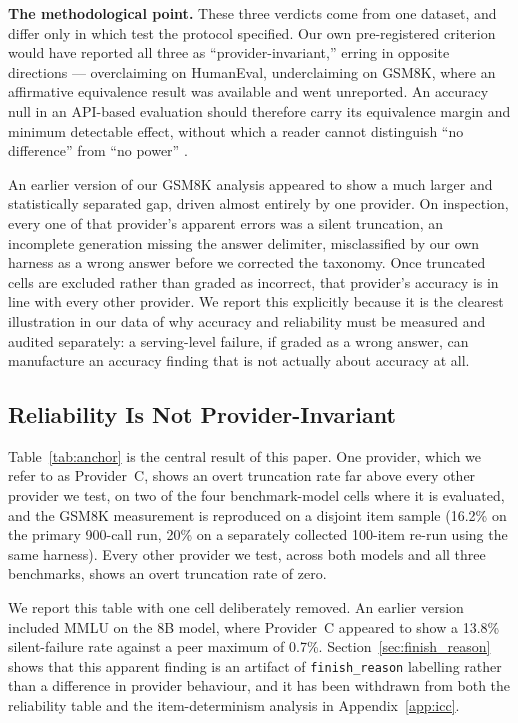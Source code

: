 \documentclass[11pt]{article}
\begin{document}
\textbf{The methodological point.} These three verdicts come from one
dataset, and differ only in which test the protocol specified. Our own
pre-registered criterion would have reported all three as
``provider-invariant,'' erring in opposite directions --- overclaiming
on HumanEval, underclaiming on GSM8K, where an affirmative equivalence
result was available and went unreported. An accuracy null in an
API-based evaluation should therefore carry its equivalence margin and
minimum detectable effect, without which a reader cannot distinguish
``no difference'' from ``no power''
\citep{card2020power, lakens2017tost}.

An earlier version of our GSM8K analysis appeared to show a much
larger and statistically separated gap, driven almost entirely by one
provider. On inspection, every one of that provider's apparent errors
was a silent truncation, an incomplete generation missing the answer
delimiter, misclassified by our own harness as a wrong answer before
we corrected the taxonomy. Once truncated cells are excluded rather
than graded as incorrect, that provider's accuracy is in line with
every other provider. We report this explicitly because it is the
clearest illustration in our data of why accuracy and reliability must
be measured and audited separately: a serving-level failure, if
graded as a wrong answer, can manufacture an accuracy finding that is
not actually about accuracy at all.

\subsection{Reliability Is Not Provider-Invariant}
\label{sec:reliability}

Table~\ref{tab:anchor} is the central result of this paper. One
provider, which we refer to as Provider~C, shows an overt truncation
rate far above every other provider we test, on two of the four
benchmark-model cells where it is evaluated, and the GSM8K measurement
is reproduced on a disjoint item sample (16.2\% on the primary
900-call run, 20\% on a separately collected 100-item re-run using the
same harness). Every other provider we test, across both models and
all three benchmarks, shows an overt truncation rate of zero.

We report this table with one cell deliberately removed. An earlier
version included MMLU on the 8B model, where Provider~C appeared to
show a 13.8\% silent-failure rate against a peer maximum of 0.7\%.
Section~\ref{sec:finish_reason} shows that this apparent finding is an
artifact of \texttt{finish\_reason} labelling rather than a difference
in provider behaviour, and it has been withdrawn from both the
reliability table and the item-determinism analysis in
Appendix~\ref{app:icc}.
\end{document}
